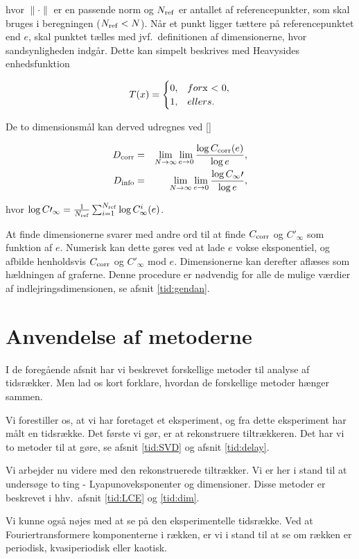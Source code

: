 hvor $\|\cdot\|$ er en passende norm og $N_{\rm ref}$ er
antallet af referencepunkter, som skal bruges i beregningen
($N_{\rm ref} < N$). N{\aa}r et punkt ligger t{\ae}ttere
p{\aa} referencepunktet end $e$, skal punktet t{\ae}lles
med jvf.\ definitionen af dimensionerne, hvor
sandsynligheden indg{\aa}r. Dette kan simpelt beskrives med
Heavysides enhedsfunktion

\[
  T(x) =
    \begin{cases}
       0, & for $x < 0$, \\
       1, & ellers.
    \end{cases}
\] 

De to dimensionsm{\aa}l kan derved udregnes ved
[]

\begin{eqnarray}
  D_{\rm corr} &=& \lim_{N\rightarrow\infty}\lim_{e\rightarrow 0} 
\frac{\log C_{\rm corr}(e)}{\log e}, \\
  D_{\rm info} &=& \lim_{N\rightarrow\infty}\lim_{e\rightarrow 0}
\frac{\log C_\infty\prime}{\log e},
\end{eqnarray}

hvor $\log C\prime_\infty = \frac{1}{N_{\rm ref}} \sum_{i=1}^{N_{\rm ref}} \log
C^i_\infty (e)$. 

\vspace{4.0mm}
At finde dimensionerne svarer med andre ord til at finde
$C_{\rm corr}$ og $C\prime_\infty$ som funktion af $e$.
Numerisk kan dette g{\o}res ved at lade $e$ vokse
eksponentiel, og afbilde henholdsvis $C_{\rm corr}$ og
$C\prime_\infty$ mod $e$. Dimensionerne kan derefter
afl{\ae}ses som h{\ae}ldningen af graferne. Denne procedure
er n{\o}dvendig for alle de mulige v{\ae}rdier af
indlejringsdimensionen, se afsnit \ref{tid:gendan}.

\section{Anvendelse af metoderne}
I de foreg{\aa}ende afsnit har vi beskrevet forskellige
metoder til analyse af tids\-r{\ae}k\-ker. Men lad os kort
forklare, hvordan de forskellige metoder h{\ae}nger sammen.

\vspace{4.0mm}
Vi forestiller os, at vi har foretaget et eksperiment, og
fra dette eksperiment har m{\aa}lt en tidsr{\ae}kke. Det
f{\o}rste vi g{\o}r, er at rekonstruere tiltr{\ae}kkeren.
Det har vi to metoder til at g{\o}re, se afsnit
\ref{tid:SVD} og afsnit \ref{tid:delay}.

\vspace{4.0mm}
Vi arbejder nu videre med den rekonstruerede
tiltr{\ae}kker. Vi er her i stand til at unders{\o}ge to
ting - Lyapunoveksponenter og dimensioner. Disse metoder er
beskrevet i hhv.\ afsnit \ref{tid:LCE} og \ref{tid:dim}.

\vspace{4.0mm}
Vi kunne ogs{\aa} n{\o}jes med at se p{\aa} den
eksperimentelle tidsr{\ae}kke. Ved at Fouriertransformere
komponenterne i r{\ae}kken, er vi i stand til at se om
r{\ae}kken er periodisk, kvasiperiodisk eller kaotisk.


